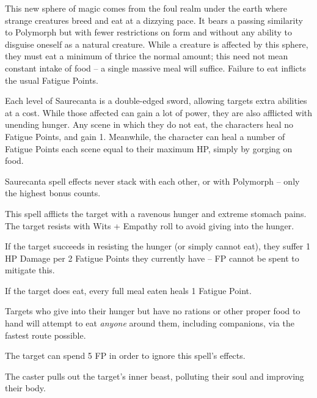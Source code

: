 \begin{multicols}{2}

\noindent
This new sphere of magic comes from the foul realm under the earth where strange creatures breed and eat at a dizzying pace.
It bears a passing similarity to Polymorph but with fewer restrictions on form and without any ability to disguise oneself as a natural creature.
While a creature is affected by this sphere, they must eat a minimum of thrice the normal amount; this need not mean constant intake of food -- a single massive meal will suffice.
Failure to eat inflicts the usual Fatigue Points.

Each level of Saurecanta is a double-edged sword, allowing targets extra abilities at a cost.
While those affected can gain a lot of power, they are also afflicted with unending hunger.
Any scene in which they do not eat, the characters heal no Fatigue Points, and gain 1.
Meanwhile, the character can heal a number of Fatigue Points each scene equal to their maximum HP, simply by gorging on food.

Saurecanta spell effects never stack with each other, or with Polymorph -- only the highest bonus counts.

\spelllevel \label{saurecantaone}


This spell afflicts the target with a ravenous hunger and extreme stomach pains.
The target resists with Wits + Empathy roll to avoid giving into the hunger.

If the target succeeds in resisting the hunger (or simply cannot eat), they suffer 1 HP Damage per 2 Fatigue Points they currently have -- FP cannot be spent to mitigate this.

If the target does eat, every full meal eaten heals 1 Fatigue Point.

Targets who give into their hunger but have no rations or other proper food to hand will attempt to eat \emph{anyone} around them, including companions, via the fastest route possible.

The target can spend 5 FP in order to ignore this spell's effects.

\spelllevel


The caster pulls out the target's inner beast, polluting their soul and improving their body.


\end{multicols}
